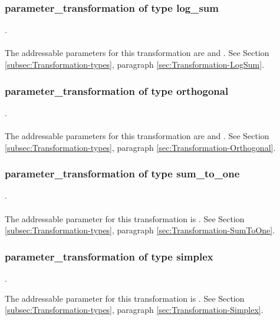 \subsubsection{parameter\_transformation of type log\_sum}
.
\label{syntax:Transformation-LogSum} \\ \\
The addressable parameters for this transformation are  and . See Section \ref{subsec:Transformation-types}, paragraph \ref{sec:Transformation-LogSum}.

\subsubsection{parameter\_transformation of type orthogonal}
.
\label{syntax:Transformation-Orthogonal} \\ \\
The addressable parameters for this transformation are  and . See Section \ref{subsec:Transformation-types}, paragraph \ref{sec:Transformation-Orthogonal}.

\subsubsection{parameter\_transformation of type sum\_to\_one}
.
\label{syntax:Transformation-SumToOne} \\ \\
The addressable parameter for this transformation is . See Section \ref{subsec:Transformation-types}, paragraph \ref{sec:Transformation-SumToOne}.

\subsubsection{parameter\_transformation of type simplex}
.
\label{syntax:Transformation-Simplex}


The addressable parameter for this transformation is . See Section \ref{subsec:Transformation-types}, paragraph \ref{sec:Transformation-Simplex}.


